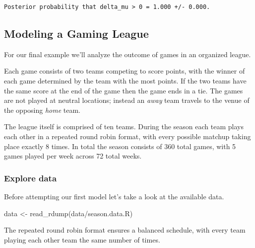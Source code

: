 \documentclass[
  letterpaper,
  DIV=11,
  numbers=noendperiod]{scrartcl}
\newenvironment{Shaded}{\begin{snugshade}}{\end{snugshade}}
\newcommand{\AttributeTok}[1]{\textcolor[rgb]{0.40,0.45,0.13}{#1}}
\newcommand{\DecValTok}[1]{\textcolor[rgb]{0.68,0.00,0.00}{#1}}
\newcommand{\FunctionTok}[1]{\textcolor[rgb]{0.28,0.35,0.67}{#1}}
\newcommand{\NormalTok}[1]{\textcolor[rgb]{0.00,0.23,0.31}{#1}}
\newcommand{\OtherTok}[1]{\textcolor[rgb]{0.00,0.23,0.31}{#1}}
\newcommand{\SpecialCharTok}[1]{\textcolor[rgb]{0.37,0.37,0.37}{#1}}
\newcommand{\StringTok}[1]{\textcolor[rgb]{0.13,0.47,0.30}{#1}}
\begin{document}
\begin{verbatim}
Posterior probability that delta_mu > 0 = 1.000 +/- 0.000.
\end{verbatim}

\subsection{Modeling a Gaming League}\label{sec:demo-league}

For our final example we'll analyze the outcome of games in an organized
league.

Each game consists of two teams competing to score points, with the
winner of each game determined by the team with the most points. If the
two teams have the same score at the end of the game then the game ends
in a tie. The games are not played at neutral locations; instead an
\emph{away} team travels to the venue of the opposing \emph{home} team.

The league itself is comprised of ten teams. During the season each team
plays each other in a repeated round robin format, with every possible
matchup taking place exactly 8 times. In total the season consists of
360 total games, with 5 games played per week across 72 total weeks.

\subsubsection{Explore data}\label{explore-data-1}

Before attempting our first model let's take a look at the available
data.

\begin{Shaded}
\begin{Highlighting}[]
\NormalTok{data }\OtherTok{\textless{}{-}} \FunctionTok{read\_rdump}\NormalTok{(}\StringTok{\textquotesingle{}data/season.data.R\textquotesingle{}}\NormalTok{)}
\end{Highlighting}
\end{Shaded}

The repeated round robin format ensures a balanced schedule, with every
team playing each other team the same number of times.

\begin{Shaded}
\end{Shaded}
\end{document}
